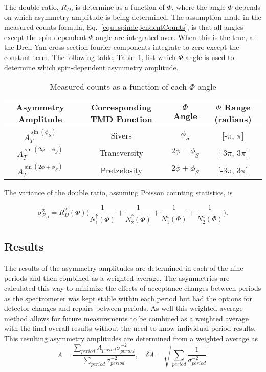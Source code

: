 The double ratio, $R_D$, is determine as a function of $\Phi$, where the angle
$\Phi$ depends on which asymmetry amplitude is being determined.  The assumption
made in the measured counts formula, Eq.~\ref{equ::spindependentCounts}, is that
all angles except the spin-dependent $\Phi$ angle are integrated over.  When
this is the true, all the Drell-Yan cross-section fourier components integrate
to zero except the constant term.  The following table,
Table~\ref{tab::ratio_phiAngles}, list which $\Phi$ angle is used to determine
which spin-dependent asymmetry amplitude.

\begin{table}[h!t]
  \centering
  \caption{Measured counts as a function of each $\Phi$ angle}
  \begin{tabular}{ |c|c|c|c| }
    \hline \textbf{Asymmetry Amplitude}& \textbf{Corresponding TMD Function}&
    \textbf{$\Phi$ Angle}& \textbf{$\Phi$ Range (radians)} \\ \hline
    
    $A^{\sin(\phi_S)}_T$& Sivers& $\phi_S$& [-$\pi$, $\pi$] \\ \hline

    $A^{\sin(2\phi-\phi_S)}_T$& Transversity& $2\phi-\phi_S$& [-3$\pi$, 3$\pi$]
    \\ \hline

    $A^{\sin(2\phi+\phi_S)}_T$& Pretzelosity& $2\phi+\phi_S$& [-3$\pi$, 3$\pi$]
    \\ \hline
  \end{tabular}
    \label{tab::ratio_phiAngles}
\end{table}

The variance of the double ratio, assuming Poisson counting statistics, is

\begin{equation}
  \sigma^2_{R_D} = R^2_D(\Phi)\Big(\frac{1}{N_1^\uparrow(\Phi)}
    + \frac{1}{N_2^\uparrow(\Phi)}
    + \frac{1}{N_1^\downarrow(\Phi)}
    +\frac{1}{N_2^\downarrow(\Phi)}
   \Big).
\end{equation}

\subsection{Results}\label{sec::doubleratio_results}
The results of the asymmetry amplitudes are determined in each of the nine
periods and then combined as a weighted average.  The asymmetries are calculated
this way to minimize the effects of acceptance changes between periods as the
spectrometer was kept stable within each period but had the options for detector
changes and repairs between periods.  As well this weighted average method
allows for future measurements to be combined as a weighted average with the
final overall results without the need to know individual period results.  This
resulting asymmetry amplitudes are determined from a weighted average as
\begin{equation}
  \label{equ::wAvg}
  A = \frac{
    \sum_{period}
  A_{period}\sigma^{-2}_{period}
  }{
    \sum_{period} \sigma^{-2}_{period}
    },
  \quad \delta A = \sqrt{\sum_{period}
  \frac{1}{\sigma^{-2}_{period}}}.
\end{equation}

